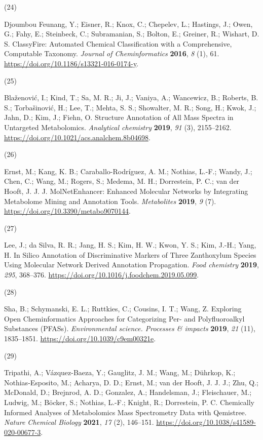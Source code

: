 \documentclass[
]{article}
\newlength{\cslhangindent}
\newlength{\csllabelwidth}
\newlength{\cslentryspacingunit} %
\newenvironment{CSLReferences}[2] %
 {%
  \setlength{\parindent}{0pt}
  \ifodd #1
  \let\oldpar\par
  \def\par{\hangindent=\cslhangindent\oldpar}
  \fi
  \setlength{\parskip}{#2\cslentryspacingunit}
 }%
 {}
\newcommand{\CSLLeftMargin}[1]{\parbox[t]{\csllabelwidth}{#1}}
\newcommand{\CSLRightInline}[1]{\parbox[t]{\linewidth - \csllabelwidth}{#1}\break}
\begin{document}
\begin{CSLReferences}{0}{0}
\leavevmode{}%
\CSLLeftMargin{(24) }%
\CSLRightInline{Djoumbou Feunang, Y.; Eisner, R.; Knox, C.; Chepelev,
L.; Hastings, J.; Owen, G.; Fahy, E.; Steinbeck, C.; Subramanian, S.;
Bolton, E.; Greiner, R.; Wishart, D. S. {ClassyFire}: Automated Chemical
Classification with a Comprehensive, Computable Taxonomy. \emph{Journal
of Cheminformatics} \textbf{2016}, \emph{8} (1), 61.
\url{https://doi.org/10.1186/s13321-016-0174-y}.}

\leavevmode{}%
\CSLLeftMargin{(25) }%
\CSLRightInline{Blaženović, I.; Kind, T.; Sa, M. R.; Ji, J.; Vaniya, A.;
Wancewicz, B.; Roberts, B. S.; Torbašinović, H.; Lee, T.; Mehta, S. S.;
Showalter, M. R.; Song, H.; Kwok, J.; Jahn, D.; Kim, J.; Fiehn, O.
Structure {Annotation} of {All Mass Spectra} in {Untargeted
Metabolomics}. \emph{Analytical chemistry} \textbf{2019}, \emph{91} (3),
2155--2162. \url{https://doi.org/10.1021/acs.analchem.8b04698}.}

\leavevmode{}%
\CSLLeftMargin{(26) }%
\CSLRightInline{Ernst, M.; Kang, K. B.; Caraballo-Rodríguez, A. M.;
Nothias, L.-F.; Wandy, J.; Chen, C.; Wang, M.; Rogers, S.; Medema, M.
H.; Dorrestein, P. C.; van der Hooft, J. J. J. {MolNetEnhancer}:
{Enhanced Molecular Networks} by {Integrating Metabolome Mining} and
{Annotation Tools}. \emph{Metabolites} \textbf{2019}, \emph{9} (7).
\url{https://doi.org/10.3390/metabo9070144}.}

\leavevmode{}%
\CSLLeftMargin{(27) }%
\CSLRightInline{Lee, J.; da Silva, R. R.; Jang, H. S.; Kim, H. W.; Kwon,
Y. S.; Kim, J.-H.; Yang, H. In Silico Annotation of Discriminative
Markers of Three {Zanthoxylum} Species Using Molecular Network Derived
Annotation Propagation. \emph{Food chemistry} \textbf{2019}, \emph{295},
368--376. \url{https://doi.org/10.1016/j.foodchem.2019.05.099}.}

\leavevmode{}%
\CSLLeftMargin{(28) }%
\CSLRightInline{Sha, B.; Schymanski, E. L.; Ruttkies, C.; Cousins, I.
T.; Wang, Z. Exploring Open Cheminformatics Approaches for Categorizing
Per- and Polyfluoroalkyl Substances ({PFASs}). \emph{Environmental
science. Processes \& impacts} \textbf{2019}, \emph{21} (11),
1835--1851. \url{https://doi.org/10.1039/c9em00321e}.}

\leavevmode{}%
\CSLLeftMargin{(29) }%
\CSLRightInline{Tripathi, A.; Vázquez-Baeza, Y.; Gauglitz, J. M.; Wang,
M.; Dührkop, K.; Nothias-Esposito, M.; Acharya, D. D.; Ernst, M.; van
der Hooft, J. J. J.; Zhu, Q.; McDonald, D.; Brejnrod, A. D.; Gonzalez,
A.; Handelsman, J.; Fleischauer, M.; Ludwig, M.; Böcker, S.; Nothias,
L.-F.; Knight, R.; Dorrestein, P. C. Chemically Informed Analyses of
Metabolomics Mass Spectrometry Data with {Qemistree}. \emph{Nature
Chemical Biology} \textbf{2021}, \emph{17} (2), 146--151.
\url{https://doi.org/10.1038/s41589-020-00677-3}.}


\end{CSLReferences}
\end{document}
